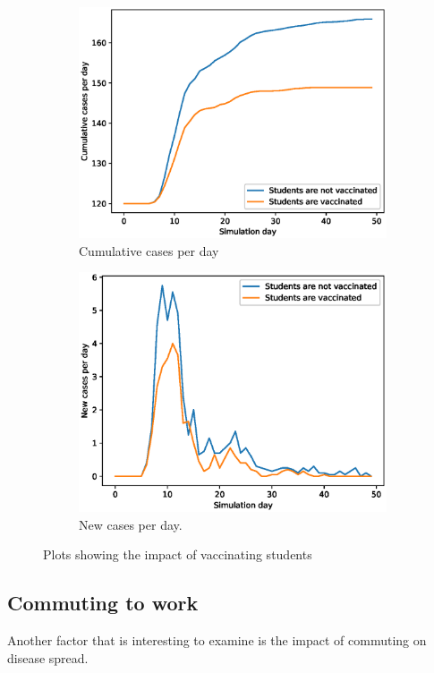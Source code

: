 \documentclass[runningheads]{llncs}
\begin{document}
\begin{figure}[h!]
	\centering
	\begin{subfigure}[b]{0.7\linewidth}
		\includegraphics[width=\textwidth]{vaccinating_cases_cum_20runs.eps}
		\caption{Cumulative cases per day} 
	\end{subfigure}
	\begin{subfigure}[b]{0.7\linewidth}
		\includegraphics[width=\textwidth]{vaccinating_cases_per_day_20runs.eps}
		\caption{New cases per day.} 
	\end{subfigure}
	\caption{Plots showing the impact of vaccinating students}
	\label{VaccinePlot}
\end{figure}

\subsection{Commuting to work}
Another factor that is interesting to examine is the impact of commuting on disease spread. 
\end{document}
